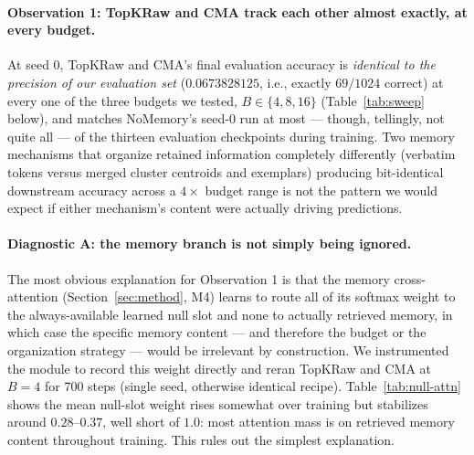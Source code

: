 \documentclass[11pt]{article}
\begin{document}
\paragraph{Observation 1: TopKRaw and CMA track each other almost exactly, at every budget.}
At seed 0, TopKRaw and CMA's final evaluation accuracy is \emph{identical to the precision of our
evaluation set} ($0.0673828125$, i.e., exactly $69/1024$ correct) at every one of the three
budgets we tested, $B \in \{4, 8, 16\}$ (Table~\ref{tab:sweep} below), and matches NoMemory's
seed-0 run at most --- though, tellingly, not quite all --- of the thirteen evaluation checkpoints
during training. Two memory mechanisms that organize retained information completely differently
(verbatim tokens versus merged cluster centroids and exemplars) producing bit-identical downstream
accuracy across a $4\times$ budget range is not the pattern we would expect if either mechanism's
content were actually driving predictions.

\paragraph{Diagnostic A: the memory branch is not simply being ignored.} The most obvious
explanation for Observation 1 is that the memory cross-attention (Section~\ref{sec:method}, M4)
learns to route all of its softmax weight to the always-available learned null slot and none to
actually retrieved memory, in which case the specific memory content --- and therefore the budget
or the organization strategy --- would be irrelevant by construction. We instrumented the module
to record this weight directly and reran TopKRaw and CMA at $B{=}4$ for 700 steps (single seed,
otherwise identical recipe). Table~\ref{tab:null-attn} shows the mean null-slot weight rises
somewhat over training but stabilizes around $0.28$--$0.37$, well short of $1.0$: most attention
mass is on retrieved memory content throughout training. This rules out the simplest explanation.
\end{document}
